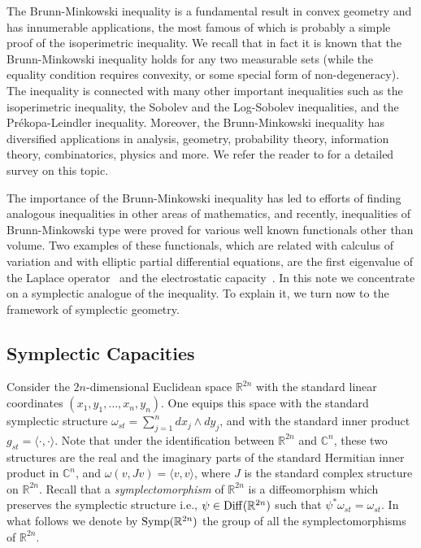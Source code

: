 \documentclass[12pt]{article}
\begin{document}
The Brunn-Minkowski inequality is a fundamental result in convex
geometry and has innumerable  applications, the most famous of which
is probably a simple proof of the isoperimetric inequality. We
recall that in fact it is known that the Brunn-Minkowski inequality
holds for any two measurable sets (while the equality condition
requires convexity, or some special form of non-degeneracy). The
inequality is connected with many other important inequalities such
as the isoperimetric inequality, the Sobolev and the Log-Sobolev
inequalities, and the Pr\'{e}kopa-Leindler inequality. Moreover, the
Brunn-Minkowski inequality has diversified applications in analysis,
geometry, probability theory, information theory, combinatorics,
physics and more. We refer the reader to \cite{Gar} for a detailed
survey on this topic.

The importance of the Brunn-Minkowski inequality has led to efforts
of finding analogous inequalities in other areas of mathematics, and
recently, inequalities of Brunn-Minkowski type were proved for
various well known functionals other than volume. Two examples of
these functionals, which are related with calculus of variation and
with elliptic partial differential equations, are the first
eigenvalue of the Laplace operator~\cite{BL} and the electrostatic
capacity~\cite{B}. In this note we concentrate on a symplectic
analogue of the inequality. To explain it, we turn now to the
framework of symplectic geometry.

\subsection{Symplectic Capacities} \label{sect-sympac}


Consider the $2n$-dimensional Euclidean space ${\mathbb R}^{2n}$
with the standard linear coordinates $(x_1,y_1, \ldots,x_n,y_n)$.
One equips this space with the standard symplectic structure
$\omega_{st} = \sum_{j=1}^n dx_j \wedge dy_j$, and with the standard
inner product $g_{st} = \langle \cdot,\cdot \rangle$.
Note that under the identification %
between ${\mathbb R}^{2n}$ and $ {\mathbb C}^n$, these two
structures are the real and the imaginary parts of the standard
Hermitian inner product in ${\mathbb C}^n$, and $\omega(v,Jv) =
\langle v , v \rangle $, where $J$ is the standard complex structure
on ${\mathbb R}^{2n}$. Recall that a {\it symplectomorphism} of
${\mathbb R}^{2n}$ is a diffeomorphism which preserves the
symplectic structure i.e., $\psi \in {\rm Diff} ( {\mathbb R}^{2n}
)$ such that $\psi^* \omega_{st} = \omega_{st}$. In what follows we
denote by ${\rm Symp}({\mathbb R}^{2n})$ the group of all the
symplectomorphisms
 of ${\mathbb R}^{2n}$.
\end{document}
